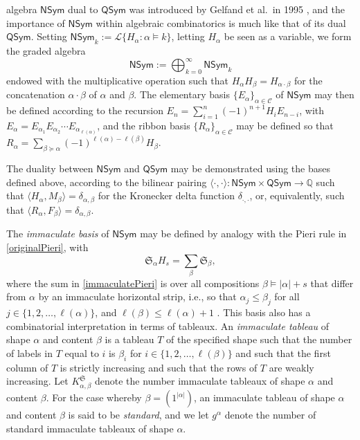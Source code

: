 \documentclass{amsart}
\theoremstyle{definition}
\begin{document}
 algebra $\textsf{NSym}$ dual to $\textsf{QSym}$ was introduced by Gelfand et al.\ in 1995 
 \cite{GelfandKrobLascouxLeclercRetakhThibon1995}, and the importance of $\textsf{NSym}$ within algebraic combinatorics is much like 
 that of its dual $\textsf{QSym}$. Setting $\textsf{NSym}_{k} := \mathscr{L}\{ H_{\alpha} : \alpha \vDash k \}$, letting $H_{\alpha}$ be seen 
 as a variable, we form the graded algebra $$ \textsf{NSym} := \bigoplus_{k=0}^{\infty} \textsf{NSym}_k $$ endowed with the 
 multiplicative operation such that $H_{\alpha} H_{\beta} = H_{\alpha \cdot \beta}$ for the concatenation $\alpha \cdot \beta$ of 
 $\alpha$ and $\beta$. The elementary basis $\{ E_{\alpha} \}_{\alpha \in \mathcal{C}}$ of $\textsf{NSym}$ may then be defined 
 according to the recursion $ E_{n} = \sum_{i=1}^{n} (-1)^{n+1} H_{i} E_{n-i}$, with $E_{\alpha} = E_{\alpha_1} E_{\alpha_2} \cdots 
 E_{\alpha_{\ell(\alpha)}}$, and the ribbon basis $ \{ R_{\alpha} \}_{\alpha \in \mathcal{C}} $ may be defined so that $ R_{\alpha} 
 = \sum_{\beta \succeq \alpha} (-1)^{\ell(\alpha) - \ell(\beta)} H_{\beta}$. 

 The duality between $\textsf{NSym}$ and $\textsf{QSym}$ may be demonstrated using the bases defined above, according to the 
 bilinear pairing $\langle \cdot, \cdot \rangle\colon \textsf{NSym} \times \textsf{QSym} \to \mathbb{Q}$ such that $\langle H_{\alpha}, 
 M_{\beta} \rangle = \delta_{\alpha, \beta}$ for the Kronecker delta function $\delta_{\cdot, \cdot}$, or, equivalently, such that $\langle 
 R_{\alpha}, F_{\beta} \rangle = \delta_{\alpha, \beta}$. 

 The \emph{immaculate basis} of $\textsf{NSym}$ may be defined by analogy with the Pieri rule in \eqref{originalPieri}, with 
\begin{equation}\label{immaculatePieri}
 \mathfrak{S}_{\alpha} H_{s} = \sum_{\beta} \mathfrak{S}_{\beta}, 
\end{equation}
 where the sum in \eqref{immaculatePieri} is over all compositions $\beta \vDash |\alpha| + s$
 that differ from $\alpha$ by an immaculate horizontal strip, i.e., so that 
 $\alpha_{j} \leq \beta_{j}$
 for all $j \in \{ 1, 2, \ldots, \ell(\alpha) \}$, and $\ell(\beta) \leq \ell(\alpha) + 1$ \cite{BergBergeronSaliolaSerranoZabrocki2014}. This basis also has a combinatorial interpretation in terms of  tableaux. An \emph{immaculate tableau} of shape $\alpha$ and content $\beta$ is a tableau $T$ of the specified shape such that the number of 
 labels in $T$ equal to $i$ is $\beta_i$ for $i \in \{ 1, 2, \ldots, \ell(\beta) \}$ and such that the first column of $T$ is strictly increasing and 
 such that the rows of $T$ are weakly increasing. Let $K_{\alpha, \beta}^{\mathfrak{S}}$ denote the number immaculate tableaux of 
 shape $\alpha$ and content $\beta$. For the case whereby $\beta = (1^{|\alpha|})$, an immaculate tableau of shape $\alpha$ and content 
 $\beta$ is said to be \emph{standard}, and we let $g^{\alpha}$ denote the number of standard immaculate tableaux of shape $\alpha$. 
\end{document}
